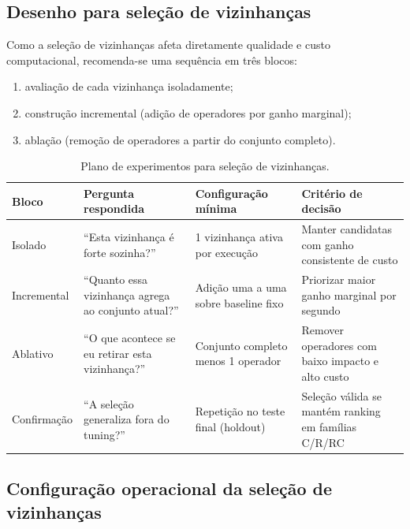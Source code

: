 \subsection{Desenho para seleção de vizinhanças}
\label{subsec:desenho_vizinhancas}

Como a seleção de vizinhanças afeta diretamente qualidade e custo computacional, recomenda-se uma sequência em três blocos:
\begin{enumerate}
  \item avaliação de cada vizinhança isoladamente;
  \item construção incremental (adição de operadores por ganho marginal);
  \item ablação (remoção de operadores a partir do conjunto completo).
\end{enumerate}

\begin{table}[htbp]
\centering
\caption{Plano de experimentos para seleção de vizinhanças.}
\label{tab:neighborhood_selection_plan}
\begin{tabular}{p{2.7cm}p{4.2cm}p{3.5cm}p{4.5cm}}
\hline
Bloco & Pergunta respondida & Configuração mínima & Critério de decisão \\
\hline
Isolado & ``Esta vizinhança é forte sozinha?'' & 1 vizinhança ativa por execução & Manter candidatas com ganho consistente de custo \\
Incremental & ``Quanto essa vizinhança agrega ao conjunto atual?'' & Adição uma a uma sobre baseline fixo & Priorizar maior ganho marginal por segundo \\
Ablativo & ``O que acontece se eu retirar esta vizinhança?'' & Conjunto completo menos 1 operador & Remover operadores com baixo impacto e alto custo \\
Confirmação & ``A seleção generaliza fora do tuning?'' & Repetição no teste final (holdout) & Seleção válida se mantém ranking em famílias C/R/RC \\
\hline
\end{tabular}
\end{table}

\subsection{Configuração operacional da seleção de vizinhanças}
\label{subsec:config_operacional_vizinhancas}

